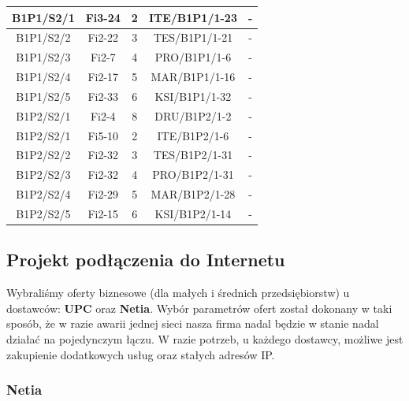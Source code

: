 \documentclass[a4paper,12pt]{extarticle}  %
\begin{document}
\begin{longtable}[c]{|c|c|c|c|c|}
	B1P1/S2/1 & Fi3-24  & 2 & ITE/B1P1/1-23 & -           \\ \hline %
	B1P1/S2/2 & Fi2-22  & 3 & TES/B1P1/1-21 & -           \\ \hline %
	B1P1/S2/3 & Fi2-7   & 4 & PRO/B1P1/1-6  & -           \\ \hline %
	B1P1/S2/4 & Fi2-17  & 5 & MAR/B1P1/1-16 & -           \\ \hline %
	B1P1/S2/5 & Fi2-33  & 6 & KSI/B1P1/1-32 & -           \\ \hline %
	B1P2/S2/1 & Fi2-4   & 8 & DRU/B1P2/1-2  & -           \\ \hline %
	B1P2/S2/1 & Fi5-10  & 2 & ITE/B1P2/1-6  & -           \\ \hline %
	B1P2/S2/2 & Fi2-32  & 3 & TES/B1P2/1-31 & -           \\ \hline %
	B1P2/S2/3 & Fi2-32  & 4 & PRO/B1P2/1-31 & -           \\ \hline %
	B1P2/S2/4 & Fi2-29  & 5 & MAR/B1P2/1-28 & -           \\ \hline %
	B1P2/S2/5 & Fi2-15  & 6 & KSI/B1P2/1-14 & -           \\ \hline %
\end{longtable}

\subsection{Projekt podłączenia do Internetu}

Wybraliśmy oferty biznesowe (dla małych i średnich przedsiębiorstw) u dostawców:
\textbf{UPC} oraz \textbf{Netia}.
Wybór parametrów ofert został dokonany w taki sposób, że w razie awarii jednej sieci nasza firma nadal
będzie w stanie nadal działać na pojedynczym łączu.
W razie potrzeb, u każdego dostawcy, możliwe jest zakupienie dodatkowych usług oraz stałych adresów IP.

\subsubsection{Netia}
\begin{figure}[H]
	\centering
\end{figure}
\end{document}
